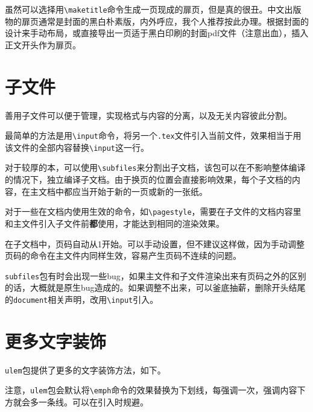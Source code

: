 \documentclass[10pt,openany]{book}
\begin{document}
\begin{sloppypar}
    虽然可以选择用\texttt{\textbackslash{}maketitle}命令生成一页现成的扉页，但是真的很丑。中文出版物的扉页通常是封面的黑白朴素版，内外呼应，我个人推荐按此办理。根据封面的设计来手动布局，或直接导出一页适于黑白印刷的封面pdf文件（注意出血），插入正文开头作为扉页。

    

    \section{子文件}

    善用子文件可以便于管理，实现格式与内容的分离，以及无关内容彼此分割。

    最简单的方法是用\texttt{\textbackslash{}input}命令，将另一个\texttt{.tex}文件引入当前文件，效果相当于用该文件的全部内容替换\texttt{\textbackslash{}input}这一行。

    

    对于较厚的本，可以使用\texttt{\textbackslash{}subfiles}来分割出子文档，该包可以在不影响整体编译的情况下，独立编译子文档。由于换页的位置会直接影响效果，每个子文档的内容，在主文档中都应当开始于新的一页或新的一张纸。

    

    对于一些在文档内使用生效的命令，如\texttt{\textbackslash{}pagestyle}，需要在子文件的文档内容里和主文件引入子文件前\textbf{都}使用，才能达到相同的渲染效果。

    在子文档中，页码自动从1开始。可以手动设置，但不建议这样做，因为手动调整页码的命令在主文件内同样生效，容易产生页码不连续的问题。

    \texttt{subfiles}包有时会出现一些bug，如果主文件和子文件渲染出来有页码之外的区别的话，大概就是原生bug造成的。如果调整不出来，可以釜底抽薪，删除开头结尾的\texttt{document}相关声明，改用\texttt{\textbackslash{}input}引入。

    \section{更多文字装饰}

    \texttt{ulem}包提供了更多的文字装饰方法，如下。

    

    

    注意，\texttt{ulem}包会默认将\texttt{\textbackslash{}emph}命令的效果替换为下划线，每强调一次，强调内容下方就会多一条线。可以在引入时规避。


\end{sloppypar}
\end{document}
